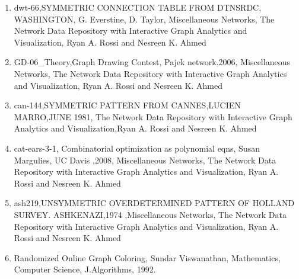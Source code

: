 \documentclass{article}
\begin{document}
\begin{enumerate}
	\item dwt-66,SYMMETRIC CONNECTION TABLE FROM DTNSRDC, WASHINGTON, G. Everstine, D. Taylor, Miscellaneous Networks,
			 The Network Data Repository with Interactive Graph Analytics and Visualization, Ryan A. Rossi and Nesreen K. Ahmed

	\item GD-06\_Theory,Graph Drawing Contest, Pajek network,2006, Miscellaneous Networks,
			 The Network Data Repository with Interactive Graph Analytics and Visualization, Ryan A. Rossi and Nesreen K. Ahmed

	\item can-144,SYMMETRIC PATTERN FROM CANNES,LUCIEN MARRO,JUNE 1981,
 			The Network Data Repository with Interactive Graph Analytics and Visualization,Ryan A. Rossi and Nesreen K. Ahmed

	\item cat-ears-3-1, Combinatorial optimization as polynomial eqns, Susan Margulies, UC Davis ,2008, Miscellaneous Networks,
			 The Network Data Repository with Interactive Graph Analytics and Visualization, Ryan A. Rossi and Nesreen K. Ahmed

	\item ash219,UNSYMMETRIC OVERDETERMINED PATTERN OF HOLLAND SURVEY. ASHKENAZI,1974 ,Miscellaneous Networks,
			 The Network Data Repository with Interactive Graph Analytics and Visualization, Ryan A. Rossi and Nesreen K. Ahmed


  	\item Randomized Online Graph Coloring, Sundar Viswanathan, Mathematics, Computer Science, J.Algorithms, 1992.
\end{enumerate}




\newpage
\end{document}
